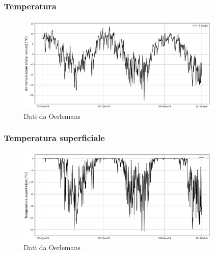 \begin{frame}
    \frametitle{Temperatura}
    \framesubtitle{}

    \begin{figure}
        \includegraphics[width=0.9\textwidth]{Immagini/tempAria.png}
        \caption{Dati da Oerlemans}
    \end{figure}
  
\end{frame}


\begin{frame}
    \frametitle{Temperatura superficiale}
    \framesubtitle{}

    \begin{figure}
        \includegraphics[width=0.9\textwidth]{Immagini/temperaturaYear.png}
        \caption{Dati da Oerlemans}
    \end{figure}
  
\end{frame}


